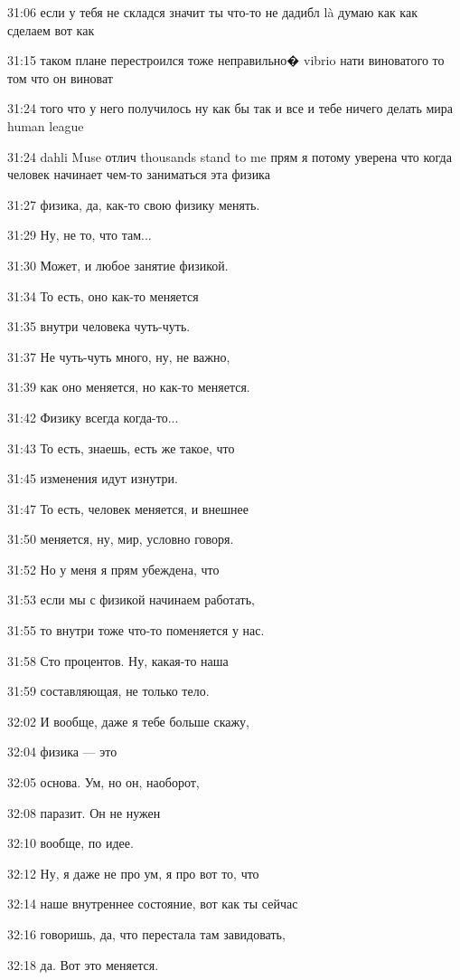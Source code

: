 31:06
если у тебя не складся значит ты что-то не дадибл là думаю как как сделаем вот как

31:15
таком плане перестроился тоже неправильно� vibrio нати виноватого то том что он виноват

31:24
того что у него получилось ну как бы так и все и тебе ничего делать мира human league

31:24
dahli Muse отлич thousands stand to me прям я потому уверена что когда человек начинает чем-то заниматься эта физика

31:27
физика, да, как-то свою физику менять.

31:29
Ну, не то, что там...

31:30
Может, и любое занятие физикой.

31:34
То есть, оно как-то меняется

31:35
внутри человека чуть-чуть.

31:37
Не чуть-чуть много, ну, не важно,

31:39
как оно меняется, но как-то меняется.

31:42
Физику всегда когда-то...

31:43
То есть, знаешь, есть же такое, что

31:45
изменения идут изнутри.

31:47
То есть, человек меняется, и внешнее

31:50
меняется, ну, мир, условно говоря.

31:52
Но у меня я прям убеждена, что

31:53
если мы с физикой начинаем работать,

31:55
то внутри тоже что-то поменяется у нас.

31:58
Сто процентов. Ну, какая-то наша

31:59
составляющая, не только тело.

32:02
И вообще, даже я тебе больше скажу,

32:04
физика — это

32:05
основа. Ум, но он, наоборот,

32:08
паразит. Он не нужен

32:10
вообще, по идее.

32:12
Ну, я даже не про ум, я про вот то, что

32:14
наше внутреннее состояние, вот как ты сейчас

32:16
говоришь, да, что перестала там завидовать,

32:18
да. Вот это меняется.

